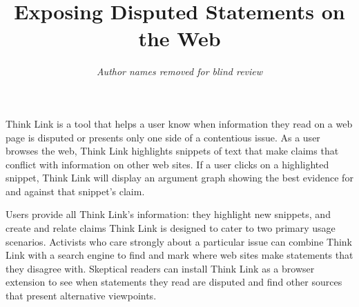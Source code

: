 \documentclass{chi2009}
\begin{document}

\toappear{}



\title{Exposing Disputed Statements on the Web}


\author{
\parbox[t]{9cm}{\centering
	     {\em Author names removed for blind review}\\
}
}

\maketitle


\abstract
Think Link is a tool that helps a user know when information they read on a web page is disputed or presents only one side of a contentious issue. %
As a user browses the web, Think Link highlights snippets of text that make claims that conflict with information on other web sites. 
If a user clicks on a highlighted snippet, Think Link will display an argument graph showing the best evidence for and against that snippet's claim. %

Users provide all Think Link's information: they highlight new snippets, and create and relate claims %
Think Link is designed to cater to two primary usage scenarios. %
Activists who care strongly about a particular issue can combine Think Link with a search engine to find and mark where web sites make statements that they disagree with.  %
Skeptical readers can install Think Link as a browser extension to see when statements they read are disputed and find other sources that present alternative viewpoints. %
\end{document}
